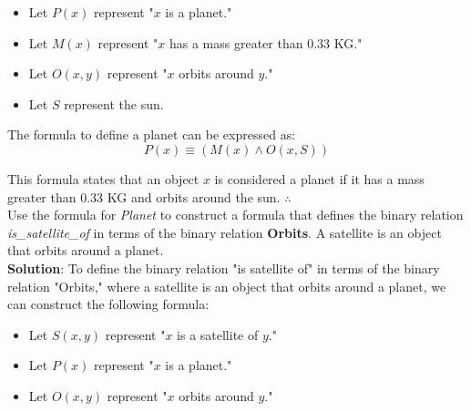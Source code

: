 \documentclass[12pt]{article}
\begin{document}
\begin{spacing}{1.5}
\begin{enumerate}
		      \begin{itemize}
		      			      			      			      			      			      			      			      			      	
		      	\item Let $P(x)$ represent "$x$ is a planet."
		      	\item Let $M(x)$ represent "$x$ has a mass greater than 0.33 KG."
		      	\item Let $O(x,y)$ represent "$x$ orbits around $y$."
		      	\item Let $S$ represent the sun.
		      	      		      	      		      	      		      	      		      	      		      	      		      	      		      	      		      	                   
		      \end{itemize}
		      		      		      		      		      		      		      		      		      
		      The formula to define a planet can be expressed as:
		      $$P(x)\equiv (M(x) \land O(x, S))$$
		      		      		      		      		      		      		      		      		      
		      This formula states that an object $x$ is considered a planet if it has a mass greater than 0.33 KG and orbits around the sun. $\therefore$ \\
		      		      		      		      		      		      		      		      		      		      
		      Use the formula for \textit{Planet} to construct a formula that defines the binary relation
		      \textit{is\_satellite\_of} in terms of the binary relation \textbf{Orbits}. A satellite is an object that orbits around a planet.\\
		      		      		      		      		      		      		      		      		      
		      \textbf{Solution}: To define the binary relation "is satellite of" in terms of the binary relation "Orbits," where a satellite is an object that orbits around a planet, we can construct the following formula:
		      		      		      		      		      		      		      		      		      
		      \begin{itemize}
		      			      			      			      			      			      			      			      			      	
		      	\item Let $S(x,y)$ represent "$x$ is a satellite of $y$."
		      	\item Let $P(x)$ represent "$x$ is a planet."
		      	\item Let $O(x,y)$ represent "$x$ orbits around $y$."
		      	      		      	      		      	      		      	      		      	      		      	      		      	      		      	      		      	      

\end{itemize}
\end{enumerate}
\end{spacing}
\end{document}
